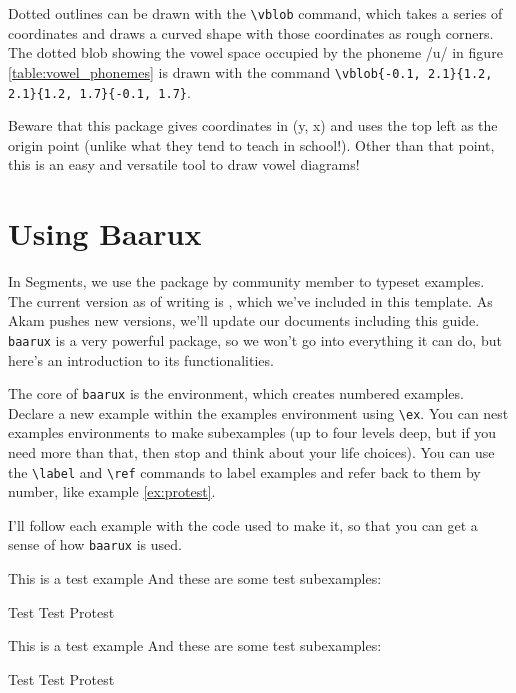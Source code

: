 Dotted outlines can be drawn with the \texttt{\textbackslash vblob} command, which takes a series of coordinates and draws a curved shape with those coordinates as rough corners. The dotted blob showing the vowel space occupied by the phoneme /u/ in figure \ref{table:vowel_phonemes} is drawn with the command \texttt{\textbackslash vblob\{-0.1, 2.1\}\{1.2, 2.1\}\{1.2, 1.7\}\{-0.1, 1.7\}}. 

Beware that this package gives coordinates in (y, x) and uses the top left as the origin point (unlike what they tend to teach in school!). Other than that point, this is an easy and versatile tool to draw vowel diagrams!

\newpage
\section*{Using Baarux}

In Segments, we use the package  by community member  to typeset examples. The current version as of writing is , which we've included in this template. As Akam pushes new versions, we'll update our documents including this guide. \texttt{baarux} is a very powerful package, so we won't go into everything it can do, but here's an introduction to its functionalities. %

The core of \texttt{baarux} is the  environment, which creates numbered examples. Declare a new example within the examples environment using \texttt{\textbackslash ex}. You can nest examples environments to make subexamples (up to four levels deep, but if you need more than that, then stop and think about your life choices). You can use the \texttt{\textbackslash label} and \texttt{\textbackslash ref} commands to label examples and refer back to them by number, like example \ref{ex:protest}.

I'll follow each example with the code used to make it, so that you can get a sense of how \texttt{baarux} is used.

\begin{examples}
    \ex This is a test example
    \ex And these are some test subexamples:
    \begin{examples}
        \ex Test
        \ex Test
        \ex Protest \label{ex:protest}
    \end{examples}
\end{examples}
\begin{verbbox}
\begin{examples}
    \ex This is a test example
    \ex And these are some test subexamples:
    \begin{examples}
        \ex Test
        \ex Test
        \ex Protest \label{ex:protest}
    \end{examples}
\end{examples}
\end{verbbox}
\fbox{\theverbbox} 

